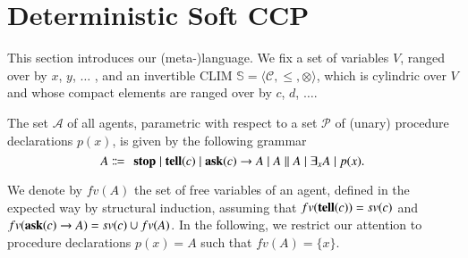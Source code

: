 \documentclass[main.tex]{subfiles}
\begin{document}
\section{Deterministic Soft CCP}\label{sec:detSCCP}
This section introduces our (meta-)language.
We fix a set of variables $V$, ranged over by $x$, $y$, $\ldots$ , and 
an invertible CLIM $\mathbb S = \langle {\mathcal C}, \leq, \otimes\rangle$, which is 
cylindric over $V$ and whose compact elements
are ranged over by $c$, $d$, $\ldots$.

\begin{definition}[Agents]%
The set $\mathcal{A}$ of all agents, %
parametric with respect to a set $\mathcal{P}$ of (unary) procedure declarations $p(x)$,
is given by the following grammar
\[ A \Coloneqq \: \: \mathit{\ostop} \mid \textit{\tell}(c)  \mid \textit{\ask}(c) \rightarrow A \mid A \parallel A \mid \exists_x A \mid %
p(x).\]  
\end{definition}

We denote by $fv(A)$ the set of free variables of an agent, defined in the expected way 
by structural induction, assuming that $fv({\bf tell}(c)) = sv(c)$ and
 $fv({\bf ask}(c) \rightarrow A) = sv(c) \cup fv(A)$.
 In the following, we restrict our attention to 
 procedure declarations $p(x) = A$ such that $fv(A) = \{x\}$.
\end{document}
